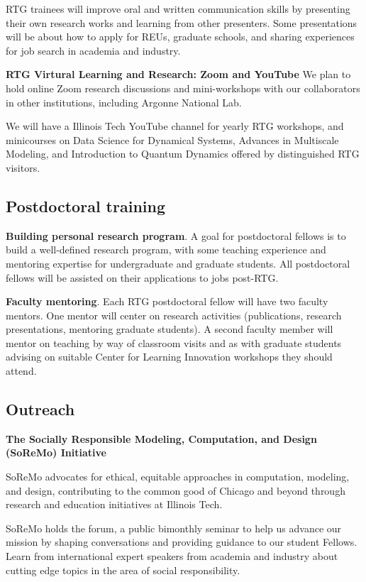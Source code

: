 \documentclass[11pt]{article}
\begin{document}
RTG trainees  will improve oral and written     communication skills by presenting their own research works and learning from other presenters. Some presentations will be about how to apply for REUs, graduate schools, and sharing experiences for job search in academia and industry. 

\textbf{RTG Virtural Learning and Research: Zoom and YouTube}
We plan to hold  online Zoom research discussions and mini-workshops with our collaborators in other institutions, including Argonne National Lab.    

We will have a Illinois Tech YouTube channel for yearly RTG workshops, and minicourses on Data Science for Dynamical Systems, Advances in Multiscale Modeling, and Introduction to Quantum Dynamics offered by distinguished RTG visitors. 
  


\subsection{Postdoctoral training}

\textbf{Building personal research program}. A goal for postdoctoral fellows is to   build a well-defined research program, with some teaching experience and mentoring expertise for undergraduate and graduate students.  All postdoctoral fellows will be assisted on their applications to jobs post-RTG.

\textbf{Faculty mentoring}. Each RTG postdoctoral fellow will have two faculty mentors. One mentor will center on research activities
(publications, research presentations, mentoring graduate students). A second faculty member will
mentor on teaching by way of classroom visits and as with graduate students advising on suitable Center for Learning Innovation workshops they should attend. 


\subsection{Outreach}
 
\textbf{The Socially Responsible Modeling, Computation, and Design
(SoReMo) Initiative}

SoReMo advocates for ethical, equitable approaches in computation,
modeling, and design, contributing to the common good of Chicago and
beyond through research and education initiatives at Illinois Tech.

SoReMo holds the forum,  a public bimonthly seminar to help us advance
our mission by shaping conversations and providing guidance to our
student Fellows. Learn from international expert speakers from academia
and industry about cutting edge topics in the area of social responsibility.
\end{document}

